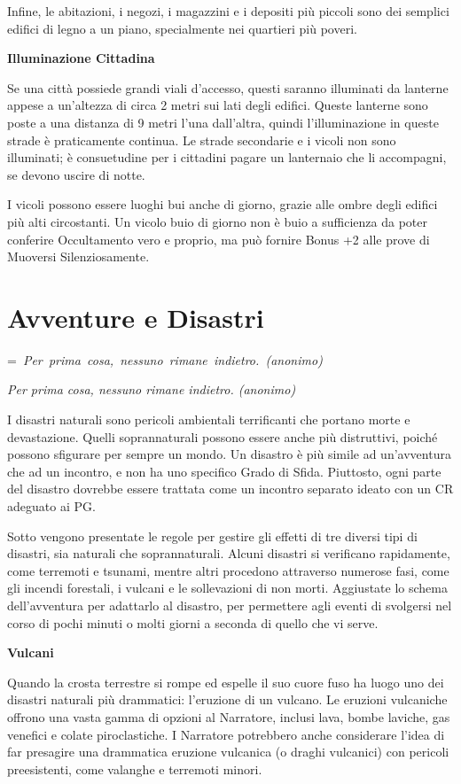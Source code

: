 \documentclass[a4paper,11pt,twoside,openany]{book}
\makeatletter
\newcommand{\mybox}[1]{%
	\setbox0=\hbox{#1}%
	\setlength{\@tempdima}{\dimexpr\wd0+13pt}%
	\begin{tcolorbox}[boxrule=0.5pt,arc=4pt, breakable,enhanced,
		left=6pt,right=6pt,top=6pt,bottom=6pt,boxsep=0pt,width=\@tempdima]
		#1
	\end{tcolorbox}
}
\makeatother
\begin{document}
{Infine, le abitazioni, i negozi, i magazzini e i depositi più piccoli sono dei semplici edifici di legno a un piano, specialmente nei quartieri più poveri.

\textbf{Illuminazione Cittadina}

Se una città possiede grandi viali d'accesso, questi saranno illuminati da lanterne appese a un'altezza di circa 2 metri sui lati degli edifici. Queste lanterne sono poste a una distanza di 9 metri l'una dall'altra, quindi l'illuminazione in queste strade è praticamente continua. Le strade secondarie e i vicoli non sono illuminati; è consuetudine per i cittadini pagare un lanternaio che li accompagni, se devono uscire di notte.

I vicoli possono essere luoghi bui anche di giorno, grazie alle ombre degli edifici più alti circostanti. Un vicolo buio di giorno non è buio a sufficienza da poter conferire Occultamento vero e proprio, ma può fornire Bonus +2 alle prove di Muoversi Silenziosamente.

\pagebreak

\section{Avventure e Disastri}

\label{avventure-e-disastri}
\mybox{\textit{
Per prima cosa, nessuno rimane indietro. (anonimo)
}}\medskip
I disastri naturali sono pericoli ambientali terrificanti che portano morte e devastazione. Quelli soprannaturali posso­no essere anche più distruttivi, poiché possono sfigurare per sempre un mondo. Un disastro è più simile ad un'avventura che ad un incontro, e non ha uno specifico Grado di Sfida. Piuttosto, ogni parte del disastro dovrebbe essere trattata come un incontro separato ideato con un CR adeguato ai PG.

Sotto vengono presentate le regole per gestire gli effetti di tre diversi tipi di disastri, sia naturali che soprannaturali. Alcuni disastri si verificano rapidamente, come terremoti e tsunami, mentre altri procedono attraverso numerose fasi, come gli incendi forestali, i vulcani e le sollevazioni di non morti. Aggiustate lo schema dell'avventura per adattarlo al disastro, per permettere agli eventi di svolgersi nel corso di pochi minuti o molti giorni a seconda di quello che vi serve.

\textbf{Vulcani}

Quando la crosta terrestre si rompe ed espelle il suo cuore fuso ha luogo uno dei disastri naturali più drammatici: l'eruzione di un vulcano. Le eruzioni vulcaniche offrono una vasta gamma di opzioni al Narratore, inclusi lava, bombe laviche, gas venefici e colate piroclastiche. I Narratore potrebbero anche considerare l'idea di far presagire una drammatica eruzione vulcanica (o draghi vulcanici) con pericoli preesistenti, come valanghe e terremoti minori.

}
\end{document}
